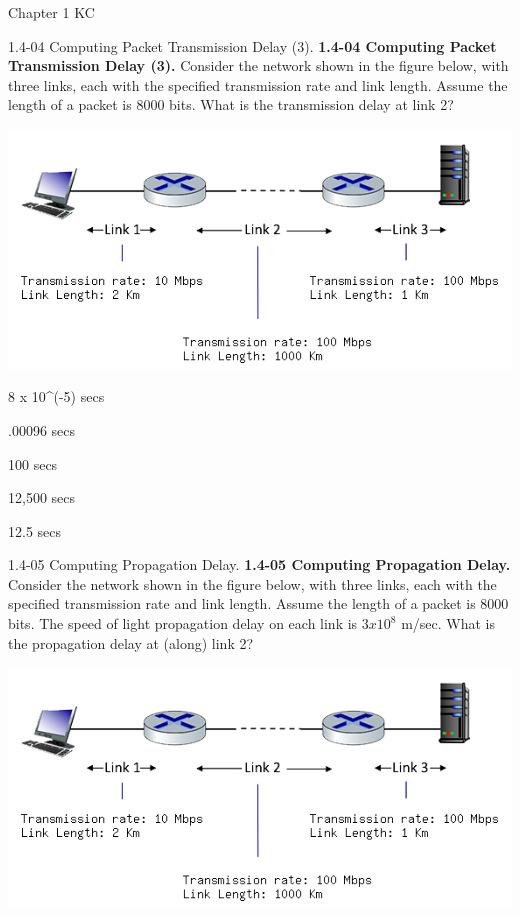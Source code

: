 \documentclass[a4paper]{article}
\begin{document}
\begin{quiz}{Chapter 1 KC}
\begin{multi}[points=1]{1.4-04 Computing Packet Transmission Delay (3).}
\textbf{1.4-04 Computing Packet Transmission Delay (3).} 
Consider the network shown in the figure below, with three links, each with the specified transmission rate and link length. Assume the length of a packet is 8000 bits. What is the transmission delay at link 2? 
\begin{center}
\includegraphics[width=\linewidth]{figs/1.4.4.png}
\end{center}
%
\item* 8 x 10^(-5) secs
\item .00096 secs
\item 100 secs
\item 12,500 secs
\item 12.5 secs
\end{multi}

\begin{multi}[points=1]{1.4-05 Computing Propagation Delay.}
\textbf{1.4-05 Computing Propagation Delay.} 
Consider the network shown in the figure below, with three links, each with the specified transmission rate and link length. Assume the length of a packet is 8000 bits. The speed of light propagation delay on each link is $3x10^8$ m/sec.
What is the propagation delay at (along) link 2? 
\begin{center}
\includegraphics[width=\linewidth]{figs/1.4.4.png}
\end{center}


\end{multi}
\end{quiz}
\end{document}
